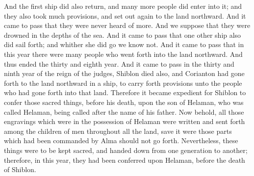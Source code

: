 And the first ship did also return, and many more people did enter into it; and they also took much provisions, and set out again to the land northward.
\bverse \iffalse And it came to pass that they were never heard of more. And we suppose that they were drowned in the depths of the sea. And it came to pass that one other ship also did sail forth; and whither she did go we know not. \fi
And it came to pass that they were never heard of more. And we suppose that they were drowned in the depths of the sea. And it came to pass that one other ship also did sail forth; and whither she did go we know not.
\bverse \iffalse And it came to pass that in this year there were many people who went forth into the land northward. And thus ended the thirty and eighth year. \fi
And it came to pass that in this year there were many people who went forth into the land northward. And thus ended the thirty and eighth year.
\bverse \iffalse And it came to pass in the thirty and ninth year of the reign of the judges, Shiblon died also, and Corianton had gone forth to the land northward in a ship, to carry forth provisions unto the people who had gone forth into that land. \fi
And it came to pass in the thirty and ninth year of the reign of the judges, Shiblon died also, and Corianton had gone forth to the land northward in a ship, to carry forth provisions unto the people who had gone forth into that land.
\bverse \iffalse Therefore it became expedient for Shiblon to confer those sacred things, before his death, upon the son of Helaman, who was called Helaman, being called after the name of his father. \fi
Therefore it became expedient for Shiblon to confer those sacred things, before his death, upon the son of Helaman, who was called Helaman, being called after the name of his father.
\bverse \iffalse Now behold, all those engravings which were in the possession of Helaman were written and sent forth among the children of men throughout all the land, save it were those parts which had been commanded by Alma should not go forth. \fi
Now behold, all those engravings which were in the possession of Helaman were written and sent forth among the children of men throughout all the land, save it were those parts which had been commanded by Alma should not go forth.
\bverse \iffalse Nevertheless, these things were to be kept sacred, and handed down from one generation to another; therefore, in this year, they had been conferred upon Helaman, before the death of Shiblon. \fi
Nevertheless, these things were to be kept sacred, and handed down from one generation to another; therefore, in this year, they had been conferred upon Helaman, before the death of Shiblon.
